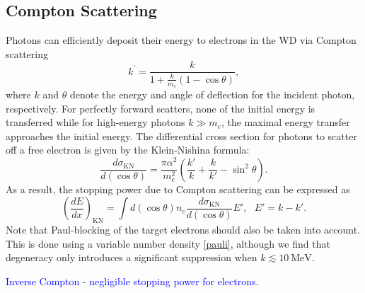 \documentclass[twocolumn,showpacs,preprintnumbers,amsmath,amssymb,prd]{revtex4}
\def\r{\right)}
\def\l{\left(}
\begin{document}
\begin{appendices}
\subsection*{Compton Scattering}
Photons can efficiently deposit their energy to electrons in the WD via Compton scattering
\begin{equation}
{k^{\prime }={\frac {k}{1+{\frac {k}{m_e}}(1-\cos \theta )}}},
\end{equation}
where $k$ and $\theta$ denote the energy and angle of deflection for the incident photon, respectively. For perfectly forward scatters, none of the initial energy is transferred while for high-energy photons $k \gg m_e$, the maximal energy transfer approaches the initial energy. The differential cross section for photons to scatter off a free electron is given by the Klein-Nishina formula:
\begin{equation}
\label{KN}
\frac{d\sigma_\text{KN}}{d (\cos \theta)}=\frac{\pi \alpha^2}{m_e^2} \l \frac{k'}{k} + \frac{k}{k'} -\sin^2 \theta \r.
\end{equation}
As a result, the stopping power due to Compton scattering can be expressed as
\begin{equation}
\label{eq:comptonSP}
\l \frac{dE}{dx}\r_\text{KN} =  \int d (\cos \theta) n_e \frac{d\sigma_\text{KN}}{d (\cos \theta)} E', ~~~ E' = k - k'.
\end{equation}
Note that Paul-blocking of the target electrons should also be taken into account. This is done using a variable number density \eqref{pauli}, although we find that degeneracy only introduces a significant suppression when $k\lesssim 10 ~\text{MeV}$.

\textcolor{blue}{Inverse Compton - negligible stopping power for electrons.}


\end{appendices}
\end{document}
